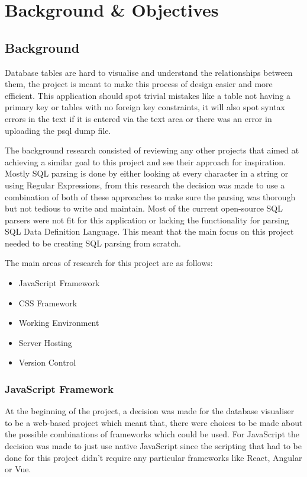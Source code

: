 
\chapter{Background \& Objectives}

\section{Background}

Database tables are hard to visualise and understand the relationships between them, the project is meant to make this process of design easier and more efficient. This application should spot trivial mistakes like a table not having a primary key or tables with no foreign key constraints, it will also spot syntax errors in the text if it is entered via the text area or there was an error in uploading the psql dump file.

The background research consisted of reviewing any other projects that aimed at achieving a similar goal to this project and see their approach for inspiration. Mostly SQL parsing is done by either looking at every character in a string or using Regular Expressions, from this research the decision was made to use a combination of both of these approaches to make sure the parsing was thorough but not tedious to write and maintain. Most of the current open-source SQL parsers were not fit for this application or lacking the functionality for parsing SQL Data Definition Language. This meant that the main focus on this project needed to be creating SQL parsing from scratch.

The main areas of research for this project are as follows:

\begin{itemize}
	\item JavaScript Framework
	\item CSS Framework
	\item Working Environment
	\item Server Hosting
	\item Version Control
\end{itemize}

\subsection{JavaScript Framework}

At the beginning of the project, a decision was made for the database visualiser to be a web-based project which meant that, there were choices to be made about the possible combinations of frameworks which could be used. For JavaScript the decision was made to just use native JavaScript since the scripting that had to be done for this project didn't require any particular frameworks like React, Angular or Vue.

